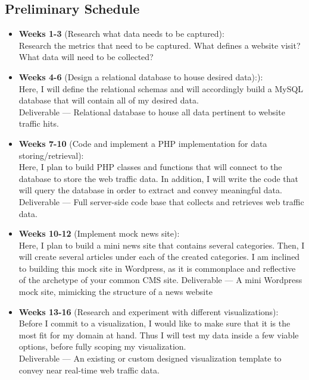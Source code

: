 \documentclass[12pt]{article}
\begin{document}

\subsection{Preliminary Schedule}
\begin{itemize}
\item[] \textbf{Weeks 1-3} (Research what data needs to be captured): \\
Research the metrics that need to be captured. What defines a website visit? What data will need to be collected?

\item[] \textbf{Weeks 4-6} (Design a relational database to house desired data):): \\
Here, I will define the relational schemas and will accordingly build a MySQL database that will contain all of my desired data. \\
Deliverable --- Relational database to house all data pertinent to website traffic hits.

\item[] \textbf{Weeks 7-10} (Code and implement a PHP implementation for data storing/retrieval): \\
Here, I plan to build PHP classes and functions that will connect to the database to store the web traffic data. In addition, I will write the code that will query the database in order to extract and convey meaningful data. \\
Deliverable --- Full server-side code base that collects and retrieves web traffic data.

\item[] \textbf{Weeks 10-12} (Implement mock news site): \\
Here, I plan to build a mini news site that contains several categories. Then, I will create several articles under each of the created categories. I am inclined to building this mock site in Wordpress, as it is commonplace and reflective of the archetype of your common CMS site.
Deliverable --- A mini Wordpress mock site, mimicking the structure of a news website

\item[] \textbf{Weeks 13-16} (Research and experiment with different visualizations): \\
Before I commit to a visualization, I would like to make sure that it is the most fit for my domain at hand. Thus I will test my data inside a few viable options, before fully scoping my visualization. \\
Deliverable --- An existing or custom designed visualization template to convey near real-time web traffic data.


\end{itemize}
\end{document}
